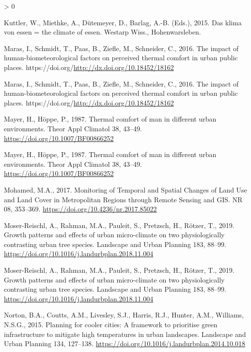 \documentclass[
]{article}
\newlength{\cslhangindent}
\newenvironment{CSLReferences}[2] %
 {%
  \setlength{\parindent}{0pt}
  \ifodd #1 \everypar{\setlength{\hangindent}{\cslhangindent}}\ignorespaces\fi
  \ifnum #2 > 0
  \setlength{\parskip}{#2\baselineskip}
  \fi
 }%
 {}
\begin{document}
\begin{CSLReferences}{1}{0}
\leavevmode\hypertarget{ref-kuttler2015}{}%
Kuttler, W., Miethke, A., Dütemeyer, D., Barlag, A.-B. (Eds.), 2015. Das klima von essen = the climate of essen. {Westarp Wiss.}, {Hohenwarsleben}.

\leavevmode\hypertarget{ref-maras2016}{}%
Maras, I., Schmidt, T., Paas, B., Ziefle, M., Schneider, C., 2016. The impact of human-biometeorological factors on perceived thermal comfort in urban public places. https://doi.org/\url{http://dx.doi.org/10.18452/18162}

\leavevmode\hypertarget{ref-maras2016}{}%
Maras, I., Schmidt, T., Paas, B., Ziefle, M., Schneider, C., 2016. The impact of human-biometeorological factors on perceived thermal comfort in urban public places. https://doi.org/\url{http://dx.doi.org/10.18452/18162}

\leavevmode\hypertarget{ref-mayer1987}{}%
Mayer, H., Höppe, P., 1987. Thermal comfort of man in different urban environments. Theor Appl Climatol 38, 43--49. \url{https://doi.org/10.1007/BF00866252}

\leavevmode\hypertarget{ref-mayer1987}{}%
Mayer, H., Höppe, P., 1987. Thermal comfort of man in different urban environments. Theor Appl Climatol 38, 43--49. \url{https://doi.org/10.1007/BF00866252}

\leavevmode\hypertarget{ref-mohamed2017}{}%
Mohamed, M.A., 2017. Monitoring of {Temporal} and {Spatial Changes} of {Land Use} and {Land Cover} in {Metropolitan Regions} through {Remote Sensing} and {GIS}. NR 08, 353--369. \url{https://doi.org/10.4236/nr.2017.85022}

\leavevmode\hypertarget{ref-moser-reischl2019a}{}%
Moser-Reischl, A., Rahman, M.A., Pauleit, S., Pretzsch, H., Rötzer, T., 2019. Growth patterns and effects of urban micro-climate on two physiologically contrasting urban tree species. Landscape and Urban Planning 183, 88--99. \url{https://doi.org/10.1016/j.landurbplan.2018.11.004}

\leavevmode\hypertarget{ref-moser-reischl2019a}{}%
Moser-Reischl, A., Rahman, M.A., Pauleit, S., Pretzsch, H., Rötzer, T., 2019. Growth patterns and effects of urban micro-climate on two physiologically contrasting urban tree species. Landscape and Urban Planning 183, 88--99. \url{https://doi.org/10.1016/j.landurbplan.2018.11.004}

\leavevmode\hypertarget{ref-norton2015}{}%
Norton, B.A., Coutts, A.M., Livesley, S.J., Harris, R.J., Hunter, A.M., Williams, N.S.G., 2015. Planning for cooler cities: {A} framework to prioritise green infrastructure to mitigate high temperatures in urban landscapes. Landscape and Urban Planning 134, 127--138. \url{https://doi.org/10.1016/j.landurbplan.2014.10.018}


\end{CSLReferences}
\end{document}
